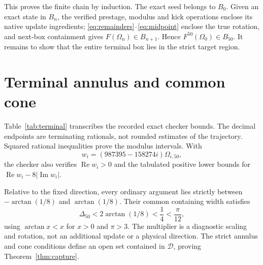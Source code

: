\documentclass[11pt,a4paper]{article}
\numberwithin{equation}{section}
\theoremstyle{remark}\newtheorem{remark}[theorem]{Remark}
\newcommand{\re}{\operatorname{Re}}\newcommand{\im}{\operatorname{Im}}
\newcommand{\D}{\mathcal D}\newcommand{\Q}{\mathcal Q}
\begin{document}
This proves the finite chain by induction. The exact seed belongs to $B_0$. Given an exact state in $B_n$, the verified prestage, modulus and kick operations enclose its native update ingredients; \eqref{eq:remainders}--\eqref{eq:midpoint} enclose the true rotation, and next-box containment gives $F(\Omega_n)\in B_{n+1}$. Hence $F^{50}(\Omega_0)\in B_{50}$. It remains to show that the entire terminal box lies in the strict target region.

\section{Terminal annulus and common cone}\label{sec:terminal}
Table~\ref{tab:terminal} transcribes the recorded exact checker bounds. The decimal endpoints are terminating rationals, not rounded estimates of the trajectory. Squared rational inequalities prove the modulus intervals. With
\begin{equation}
w_i=(987395-158274i)\Omega_{i,50},\label{eq:multiplier}
\end{equation}
the checker also verifies $\re w_i>0$ and the tabulated positive lower bounds for $\re w_i-8|\im w_i|$.



Relative to the fixed direction, every ordinary argument lies strictly between $-\arctan(1/8)$ and $\arctan(1/8)$. Their common containing width satisfies
\begin{equation}
\Delta_{50}<2\arctan(1/8)<\frac14<\frac\pi{12},\label{eq:cone}
\end{equation}
using $\arctan x<x$ for $x>0$ and $\pi>3$. The multiplier is a diagnostic scaling and rotation, not an additional update or a physical direction. The strict annulus and cone conditions define an open set contained in $\D$, proving Theorem~\ref{thm:capture}.

\clearpage
\end{document}
